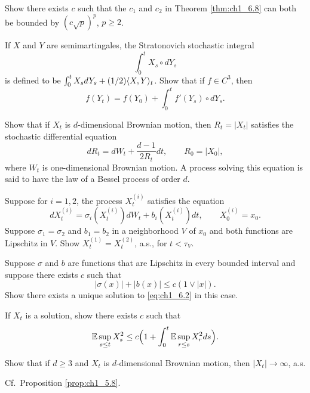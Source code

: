 \begin{exercise}\label{ex:ch1_29}
Show there exists $c$ such that the $c_1$ and $c_2$ in Theorem \ref{thm:ch1_6.8} can both be bounded by $(c\sqrt{p})^p$, $p \geq 2$.
\end{exercise}

\mpagebreak

\begin{exercise}\label{ex:ch1_30}
If $X$ and $Y$ are semimartingales, the Stratonovich stochastic integral
\[
    \int_0^t X_s \circ dY_s
\]
is defined to be $\int_0^t X_s dY_s + (1/2)\langle X,Y \rangle_t$. Show that if $f \in C^3$, then
\[
    f(Y_t) = f(Y_0) + \int_0^t f'(Y_s) \circ dY_s.
\]
\end{exercise}

\begin{exercise}\label{ex:ch1_31}
Show that if $X_t$ is $d$-dimensional Brownian motion, then $R_t = |X_t|$ satisfies the stochastic differential equation
\[
    dR_t = dW_t + \frac{d-1}{2R_t}dt, \qquad R_0 = |X_0|,
\]
where $W_t$ is one-dimensional Brownian motion. A process solving this equation is said to have the law of a Bessel process of order $d$.
\end{exercise}

\begin{exercise}\label{ex:ch1_32}
Suppose for $i=1,2$, the process $X_t^{(i)}$ satisfies the equation
\[
    dX_t^{(i)} = \sigma_i(X_t^{(i)})dW_t + b_i(X_t^{(i)})dt, \qquad X_0^{(i)} = x_0.
\]
Suppose $\sigma_1 = \sigma_2$ and $b_1 = b_2$ in a neighborhood $V$ of $x_0$ and both functions are Lipschitz in $V$. Show $X_t^{(1)} = X_t^{(2)}$, a.s., for $t < \tau_V$.
\end{exercise}

\begin{exercise}\label{ex:ch1_33}
Suppose $\sigma$ and $b$ are functions that are Lipschitz in every bounded interval and suppose there exists $c$ such that
\[
    |\sigma(x)| + |b(x)| \leq c(1 \vee |x|).
\]
Show there exists a unique solution to \eqref{eq:ch1_6.2} in this case.

\hint If $X_t$ is a solution, show there exists $c$ such that
\[
    \mathbb{E} \sup_{s\leq t} X_s^2 \leq c\Big(1 + \int_0^t \mathbb{E} \sup_{r\leq s} X_r^2 ds\Big).
\]
\end{exercise}

\begin{exercise}\label{ex:ch1_34}
Show that if $d \geq 3$ and $X_t$ is $d$-dimensional Brownian motion, then $|X_t| \to \infty$, a.s.

\hint Cf.\ Proposition \ref{prop:ch1_5.8}.
\end{exercise}

